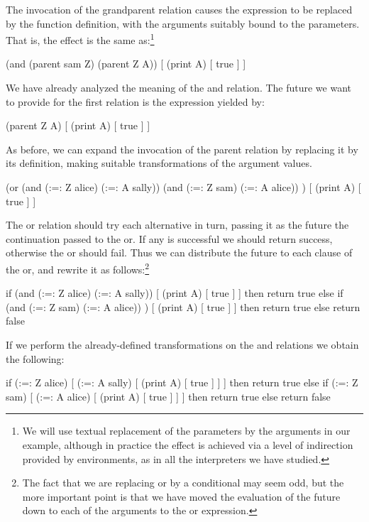 The invocation of the {\sf grandparent} relation causes the expression to
be replaced by the function definition, with the arguments suitably bound
to the parameters.   That is, the effect is the same as:\footnote{We will
use textual replacement of the parameters by the arguments in our example,
although in practice the effect is achieved via a level of indirection
provided by environments, as in all the interpreters we have studied.}

\begin{cprog}
(and (parent sam Z) (parent Z A)) [ (print A) [ true ] ]
\end{cprog}

We have already analyzed the meaning of the {\sf and} relation.  The future
we want to provide for the first relation is the expression yielded by:

\begin{cprog}
(parent Z A) [ (print A) [ true ] ]
\end{cprog}

As before, we can expand the invocation of the {\sf parent} relation by
replacing it by its definition, making suitable transformations of the
argument values.

\begin{cprog}
(or
	(and (:=: Z alice) (:=: A sally))
	(and (:=: Z sam) (:=: A alice)) )
		[ (print A) [ true ] ]
\end{cprog}

The {\sf or} relation should try each alternative in turn, passing it as
the future the continuation passed to the or.  If any is successful we
should return success, otherwise the or should fail.
Thus we can distribute the future to each clause of the or, and rewrite it
as follows:\footnote{The fact that we are replacing or by a conditional 
may seem odd,
but the more important point is that we have moved the evaluation of the
future down to each of the arguments to the or expression.}

\begin{cprog}
if (and (:=: Z alice) (:=: A sally))
		[ (print A) [ true ] ]
then return true
else if (and (:=: Z sam) (:=: A alice)) )
		[ (print A) [ true ] ]
then return true
else return false
\end{cprog}

If we perform the already-defined transformations on the {\sf and} 
relations we obtain the following:

\begin{cprog}
if (:=: Z alice) [ (:=: A sally) [ (print A) [ true ] ] ]
then return true
else if (:=: Z sam) [ (:=: A alice) [ (print A) [ true ] ] ]
then return true
else return false
\end{cprog}

